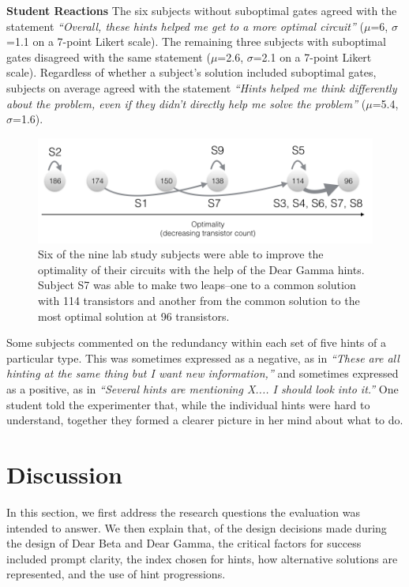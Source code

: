 {\bf Student Reactions} The six subjects without suboptimal gates agreed with the statement {\it ``Overall, these hints helped me get to a more optimal circuit''} ($\mu$=6, $\sigma$=1.1 on a 7-point Likert scale). The remaining three subjects with suboptimal gates disagreed with the same statement ($\mu$=2.6, $\sigma$=2.1 on a 7-point Likert scale). Regardless of whether a subject's solution included suboptimal gates, subjects on average agreed with the statement {\it ``Hints helped me think differently about the problem, even if they didn't directly help me solve the problem'' } ($\mu$=5.4, $\sigma$=1.6).



\begin{figure}
\centering
\includegraphics[width=1.0\columnwidth]{Body/figures/classoverflow/dearGammaResults.png}
\caption{Six of the nine lab study subjects were able to improve the optimality of their circuits with the help of the Dear Gamma hints. Subject S7 was able to make two leaps--one to a common solution with 114 transistors and another from the common solution to the most optimal solution at 96 transistors.}
\label{fig:gammaresults}
\end{figure}

Some subjects commented on the redundancy within each set of five hints of a particular type. This was sometimes expressed as a negative, as in {\it ``These are all hinting at the same thing but I want new information,''} and sometimes expressed as a positive, as in {\it ``Several hints are mentioning X.... I should look into it.''} One student told the experimenter that, while the individual hints were hard to understand, together they formed a clearer picture in her mind about what to do.


\section{Discussion}
In this section, we first address the research questions the evaluation was intended to answer. We then explain that, of the design decisions made during the design of Dear Beta and Dear Gamma, the critical factors for success included prompt clarity, the index chosen for hints, how alternative solutions are represented, and the use of hint progressions.


